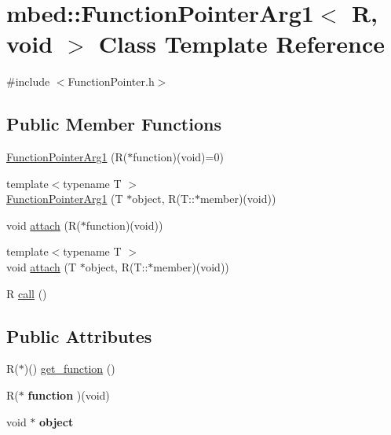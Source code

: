 \hypertarget{classmbed_1_1FunctionPointerArg1_3_01R_00_01void_01_4}{}\section{mbed\+:\+:Function\+Pointer\+Arg1$<$ R, void $>$ Class Template Reference}
\label{classmbed_1_1FunctionPointerArg1_3_01R_00_01void_01_4}


{\ttfamily \#include $<$Function\+Pointer.\+h$>$}

\subsection*{Public Member Functions}
\begin{DoxyCompactItemize}
\item 
\hyperlink{classmbed_1_1FunctionPointerArg1_3_01R_00_01void_01_4_a65b6e85f8de8f88faeb9b357cb568dee}{Function\+Pointer\+Arg1} (R($\ast$function)(void)=0)
\item 
{\footnotesize template$<$typename T $>$ }\\\hyperlink{classmbed_1_1FunctionPointerArg1_3_01R_00_01void_01_4_a8235db4bf1262037602ac60d01eaa79d}{Function\+Pointer\+Arg1} (T $\ast$object, R(T\+::$\ast$member)(void))
\item 
void \hyperlink{classmbed_1_1FunctionPointerArg1_3_01R_00_01void_01_4_adbf8ac78db6850466a5696ced1780e74}{attach} (R($\ast$function)(void))
\item 
{\footnotesize template$<$typename T $>$ }\\void \hyperlink{classmbed_1_1FunctionPointerArg1_3_01R_00_01void_01_4_aa01e20798796e65a264b2905b9c803b0}{attach} (T $\ast$object, R(T\+::$\ast$member)(void))
\item 
R \hyperlink{classmbed_1_1FunctionPointerArg1_3_01R_00_01void_01_4_ae2508209ffd3a9cf4cc4e06d2fd6e7d7}{call} ()
\end{DoxyCompactItemize}
\subsection*{Public Attributes}
\begin{DoxyCompactItemize}
\item 
R($\ast$)() \hyperlink{classmbed_1_1FunctionPointerArg1_3_01R_00_01void_01_4_a792794bb5157153b294de75f0fc6fc92}{get\+\_\+function} ()
\item 
R($\ast$ {\bfseries function} )(void)\hypertarget{classmbed_1_1FunctionPointerArg1_3_01R_00_01void_01_4_aca5441edfa68308f6b446b56abb77fdd}{}\label{classmbed_1_1FunctionPointerArg1_3_01R_00_01void_01_4_aca5441edfa68308f6b446b56abb77fdd}

\item 
void $\ast$ {\bfseries object}\hypertarget{classmbed_1_1FunctionPointerArg1_3_01R_00_01void_01_4_a31306f38154e96e5a54c3a29814a0ad5}{}\label{classmbed_1_1FunctionPointerArg1_3_01R_00_01void_01_4_a31306f38154e96e5a54c3a29814a0ad5}

\end{DoxyCompactItemize}


